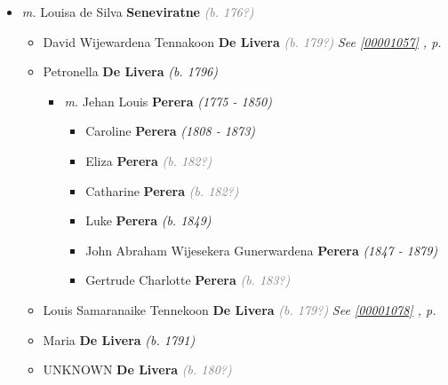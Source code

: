 \documentclass[10pt, openany]{book}
\begin{document}
\begin{itemize}
\item{\textit{m.} Louisa de Silva \textbf{Seneviratne} \textcolor{gray}{\textit{(b. 176?)}}   \label{couple:00001055:00001056} \begin{itemize}
\item{David Wijewardena Tennakoon \textbf{De Livera} \textcolor{gray}{\textit{(b. 179?)}} \textcolor{slteal}{\textit{See  \autoref{00001057} \textit{, p. \pageref{00001057} }}}}
\item{Petronella \textbf{De Livera} \textcolor{slorange}{\textit{(b. 1796)}}
\begin{itemize}
\item{\textit{m.} Jehan Louis \textbf{Perera} \textcolor{slorange}{\textit{(1775 - 1850)}}   \label{couple:00001164:00001165} \begin{itemize}
\item{Caroline \textbf{Perera} \textcolor{slorange}{\textit{(1808 - 1873)}}
 }
\item{Eliza \textbf{Perera} \textcolor{gray}{\textit{(b. 182?)}}
 }
\item{Catharine \textbf{Perera} \textcolor{gray}{\textit{(b. 182?)}}
 }
\item{Luke \textbf{Perera} \textcolor{slorange}{\textit{(b. 1849)}}
 }
\item{John Abraham Wijesekera Gunerwardena \textbf{Perera} \textcolor{slorange}{\textit{(1847 - 1879)}}
    }
\item{Gertrude Charlotte \textbf{Perera} \textcolor{gray}{\textit{(b. 183?)}}
  }
\end{itemize}}
\end{itemize}
  }
\item{Louis Samaranaike Tennekoon \textbf{De Livera} \textcolor{gray}{\textit{(b. 179?)}} \textcolor{slteal}{\textit{See  \autoref{00001078} \textit{, p. \pageref{00001078} }}}}
\item{Maria \textbf{De Livera} \textcolor{slorange}{\textit{(b. 1791)}}
  }
\item{UNKNOWN \textbf{De Livera} \textcolor{gray}{\textit{(b. 180?)}}
  }
\end{itemize}}
\end{itemize}
     
\end{document}
